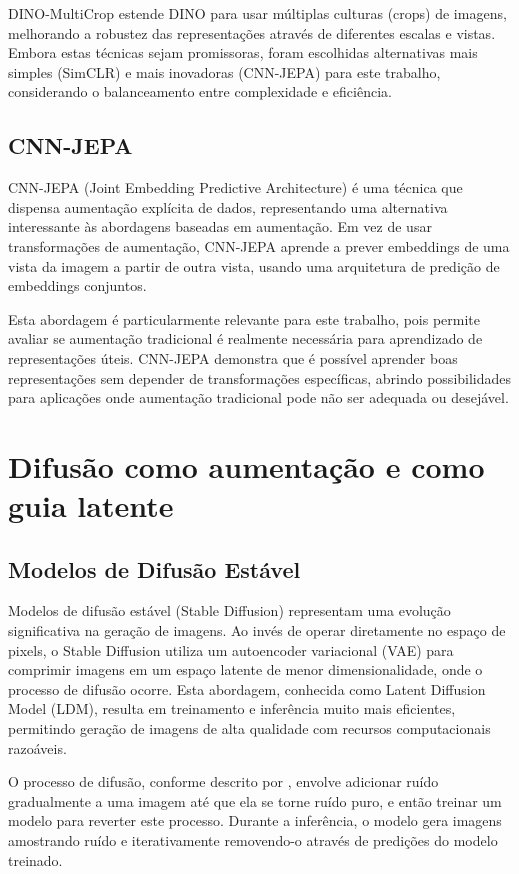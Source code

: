 DINO-MultiCrop estende DINO para usar múltiplas culturas (crops) de imagens, melhorando a robustez das representações através de diferentes escalas e vistas. Embora estas técnicas sejam promissoras, foram escolhidas alternativas mais simples (SimCLR) e mais inovadoras (CNN-JEPA) para este trabalho, considerando o balanceamento entre complexidade e eficiência.

\subsection{CNN-JEPA}

CNN-JEPA (Joint Embedding Predictive Architecture) \cite{kalapos2025cnnjepa} é uma técnica que dispensa aumentação explícita de dados, representando uma alternativa interessante às abordagens baseadas em aumentação. Em vez de usar transformações de aumentação, CNN-JEPA aprende a prever embeddings de uma vista da imagem a partir de outra vista, usando uma arquitetura de predição de embeddings conjuntos.

Esta abordagem é particularmente relevante para este trabalho, pois permite avaliar se aumentação tradicional é realmente necessária para aprendizado de representações úteis. CNN-JEPA demonstra que é possível aprender boas representações sem depender de transformações específicas, abrindo possibilidades para aplicações onde aumentação tradicional pode não ser adequada ou desejável.

\section{Difusão como aumentação e como guia latente}

\subsection{Modelos de Difusão Estável}

Modelos de difusão estável (Stable Diffusion) \cite{rombach2022high} representam uma evolução significativa na geração de imagens. Ao invés de operar diretamente no espaço de pixels, o Stable Diffusion utiliza um autoencoder variacional (VAE) para comprimir imagens em um espaço latente de menor dimensionalidade, onde o processo de difusão ocorre. Esta abordagem, conhecida como Latent Diffusion Model (LDM), resulta em treinamento e inferência muito mais eficientes, permitindo geração de imagens de alta qualidade com recursos computacionais razoáveis.

O processo de difusão, conforme descrito por \cite{ho2020denoising}, envolve adicionar ruído gradualmente a uma imagem até que ela se torne ruído puro, e então treinar um modelo para reverter este processo. Durante a inferência, o modelo gera imagens amostrando ruído e iterativamente removendo-o através de predições do modelo treinado.

